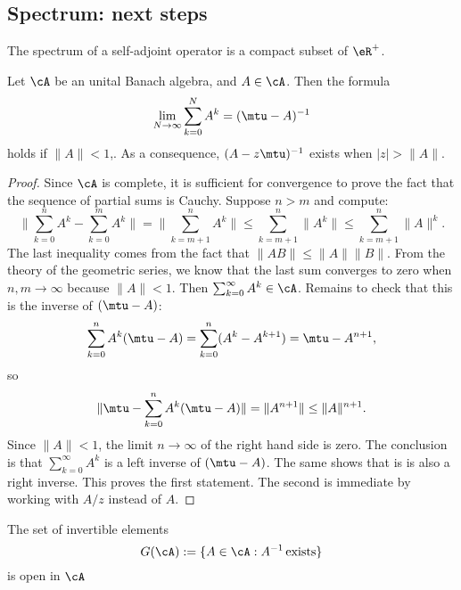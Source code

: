 \subsection{Spectrum: next steps}

\begin{lemma}
The spectrum of a self-adjoint operator is a compact subset of $\eR^+$.
\end{lemma}

\begin{lemma}\label{lem:cv_Ak}
Let $\cA$ be an unital Banach algebra, and $A\in\cA$. Then the formula
\begin{equation}
   \lim_{N\to\infty}\sum_{k=0}^{N}A^k = (\mtu-A)^{-1}
\end{equation}
holds if $\|A\|< 1$,. As a consequence, $(A-z\mtu)^{-1}$ exists when $|z|>\|A\|$.
\end{lemma}

\begin{proof}
	Since $\cA$ is complete, it is sufficient for convergence to prove the fact that the sequence of partial sums is Cauchy. Suppose $n>m$ and compute:
	\[
	  \| \sum_{k=0}^nA^k-\sum_{k=0}^mA^k  \|=\| \sum_{k=m+1}^nA^k \|\leq\sum_{k=m+1}^n\|A^k\|
	     \leq\sum_{k=m+1}^n\|A\|^k.
	\]
	The last inequality comes from the fact that $\|AB\|\leq\|A\|\|B\|$. From the theory of the geometric series, we know that the last sum converges to zero when $n,m\to\infty$ because $\|A\|<1$.
	Then 
	$   \sum_{k=0}^{\infty}A^k\in\cA$.
	Remains to check that this is the inverse of $(\mtu-A)$:
	\[
	   \sum_{k=0}^nA^k(\mtu-A)=\sum_{k=0}^n(A^k-A^{k+1})=\mtu-A^{n+1},
	\]
	so
	\[
	   \|\mtu-\sum_{k=0}^nA^k(\mtu-A)   \|=\|A^{n+1}\|\leq\|A\|^{n+1}.
	\]
	Since $\|A\|< 1$, the limit $n\to\infty$ of the right hand side is zero. The conclusion is that $\sum_{k=0}^{\infty}A^k$ is a left inverse of $(\mtu-A)$. The same shows that is is also a right inverse. This proves the first statement. The second is immediate by working with $A/z$ instead of $A$.

\end{proof}

\begin{lemma}
The set of invertible elements
\[
   G(\cA):=\{A\in\cA : A^{-1}\,\text{exists}\}
\]
is open in $\cA$
\end{lemma} \label{lem:G_ouvert}

